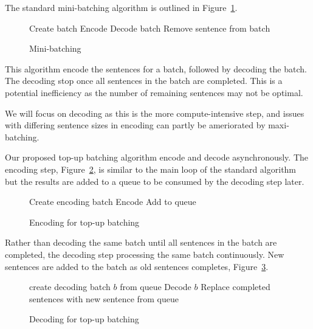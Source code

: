 \documentclass[11pt,a4paper]{article}
\begin{document}
The standard mini-batching algorithm is outlined in Figure~\ref{algo:Mini-batching}.

\begin{figure} [h]
\begin{algorithmic}
  \STATE Create batch
  \STATE Encode
    \STATE Decode batch
        \STATE Remove sentence from batch
      \ENDIF
    \ENDFOR
  \ENDWHILE
\ENDWHILE 
\end{algorithmic}
\caption{Mini-batching}
\label{algo:Mini-batching}
\end{figure}

This algorithm encode the sentences for a batch, followed by decoding the batch. The decoding stop once all sentences in the batch are completed. This is a potential inefficiency as the number of remaining sentences may not be optimal.

We will focus on decoding as this is the more compute-intensive step, and issues with differing sentence sizes in encoding can partly be ameriorated by maxi-batching.

Our proposed top-up batching algorithm encode and decode asynchronously. The encoding step, Figure~\ref{algo:Encoding for top-up batching}, is similar to the main loop of the standard algorithm but the results are added to a queue to be consumed by the decoding step later.

\begin{figure} [h]
\begin{algorithmic}
  \STATE Create encoding batch
  \STATE Encode
  \STATE Add to queue
\ENDWHILE 
\end{algorithmic}
\caption{Encoding for top-up batching}
\label{algo:Encoding for top-up batching}
\end{figure}

Rather than decoding the same batch until all sentences in the batch are completed, the decoding step processing the same batch continuously. New sentences are added to the batch as old sentences completes, Figure~\ref{algo:Decoding for top-up batching}.

\begin{figure} [h]
\begin{algorithmic}
\STATE create decoding batch $b$ from queue
  \STATE Decode $b$
  \STATE Replace completed sentences with new sentence from queue
\ENDWHILE 
\end{algorithmic}
\caption{Decoding for top-up batching}
\label{algo:Decoding for top-up batching}
\end{figure}
\end{document}
